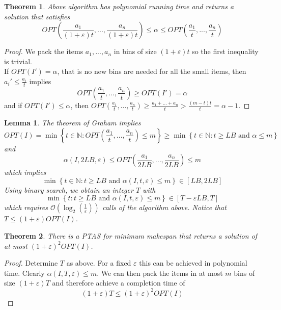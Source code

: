 \documentclass[a4paper, 12pt]{article}
\newtheorem{theorem}{Theorem}[section]
\newtheorem{lemma}{Lemma}[section]
\begin{document}
	\begin{theorem}
		Above algorithm has polynomial running time and returns a solution that satisfies \[OPT\left(\frac{a_1}{(1+\varepsilon)t},...,\frac{a_n}{(1+\varepsilon)t}\right) \leq \alpha \leq OPT\left(\frac{a_1}{t},...,\frac{a_n}{t}\right)\]
	\end{theorem}
	\begin{proof}
		We pack the items $a_1,...,a_n$ in bins of size $(1+\varepsilon)t$ so the first inequality is trivial.\\
		If $OPT(I') = \alpha$, that is no new bins are needed for all the small items, then $a_i' \leq \frac{a_i}{t}$ implies \[OPT\left(\frac{a_1}{t},...,\frac{a_n}{t}\right) \geq OPT(I') = \alpha\] and if $OPT(I') \leq \alpha$, then $OPT\left(\frac{a_1}{t},...,\frac{a_n}{t}\right) \geq \frac{a_1+...+a_n}{t} > \frac{(m-t)t}{t} = \alpha-1$.
	\end{proof}
	\begin{lemma}
		The theorem of Graham implies \[OPT(I)  = \min\left\{t \in \mathbb{N}: OPT\left(\frac{a_1}{t},...,\frac{a_n}{t}\right) \leq m\right\} \geq \min\left\{t \in \mathbb{N}: t \geq LB \text{ and } \alpha \leq m\right\}\] and \[\alpha(I,2LB,\varepsilon) \leq OPT\left(\frac{a_1}{2LB},...,\frac{a_n}{2LB}\right) \leq m\] which implies \[\min\left\{t \in \mathbb{N}: t \geq LB \text{ and } \alpha(I,t,\varepsilon) \leq m\right\} \in [LB, 2LB]\]
		Using binary search, we obtain an integer $T$ with \[\min\left\{t: t \geq LB \text{ and } \alpha(I,t,\varepsilon) \leq m\right\} \in [T-\varepsilon LB, T]\] which requires $\mathcal{O}\left(\log_2\left(\frac{1}{\varepsilon}\right)\right)$ calls of the algorithm above. Notice that $T \leq (1+\varepsilon)OPT(I)$.
	\end{lemma}
	\begin{theorem}
		There is a PTAS for minimum makespan that returns a solution of at most $(1+\varepsilon)^2OPT(I)$.
	\end{theorem}
	\begin{proof}
		Determine $T$ as above. For a fixed $\varepsilon$ this can be achieved in polynomial time. Clearly $\alpha(I,T,\varepsilon) \leq m$. We can then pack the items in at most $m$ bins of size $(1+\varepsilon)T$ and therefore achieve a completion time of \[(1+\varepsilon)T \leq (1+\varepsilon)^2OPT(I)\] 
	\end{proof}
\end{document}

